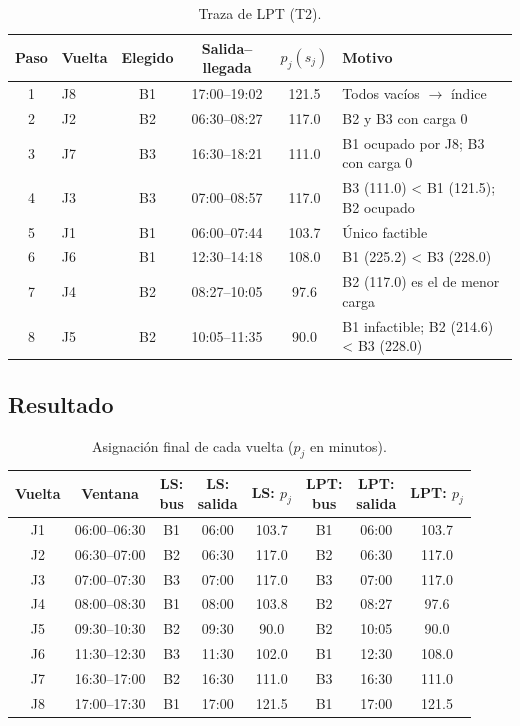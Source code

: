 \begin{table}[H]
\centering\small
\caption{Traza de LPT (T2).}\label{tab:traza-lpt}
\begin{tabular}{clcccl}
\toprule
Paso & Vuelta & Elegido & Salida--llegada & $p_j(s_j)$ & Motivo \\
\midrule
1 & J8 & B1 & 17:00--19:02 & 121.5 & Todos vacíos $\to$ índice \\
2 & J2 & B2 & 06:30--08:27 & 117.0 & B2 y B3 con carga 0 \\
3 & J7 & B3 & 16:30--18:21 & 111.0 & B1 ocupado por J8; B3 con carga 0 \\
4 & J3 & B3 & 07:00--08:57 & 117.0 & B3 (111.0) < B1 (121.5); B2 ocupado \\
5 & J1 & B1 & 06:00--07:44 & 103.7 & Único factible \\
6 & J6 & B1 & 12:30--14:18 & 108.0 & B1 (225.2) < B3 (228.0) \\
7 & J4 & B2 & 08:27--10:05 & 97.6 & B2 (117.0) es el de menor carga \\
8 & J5 & B2 & 10:05--11:35 & 90.0 & B1 infactible; B2 (214.6) < B3 (228.0) \\
\bottomrule
\end{tabular}
\end{table}

\subsection{Resultado}
\begin{table}[H]
\centering\small
\caption{Asignación final de cada vuelta ($p_j$ en minutos).}\label{tab:manual-asig}
\setlength{\tabcolsep}{5pt}
\begin{tabular}{cccccccc}
\toprule
Vuelta & Ventana & \makecell{LS:\\bus} & \makecell{LS:\\salida} & \makecell{LS:\\$p_j$} & \makecell{LPT:\\bus} & \makecell{LPT:\\salida} & \makecell{LPT:\\$p_j$} \\
\midrule
J1 & 06:00--06:30 & B1 & 06:00 & 103.7 & B1 & 06:00 & 103.7 \\
J2 & 06:30--07:00 & B2 & 06:30 & 117.0 & B2 & 06:30 & 117.0 \\
J3 & 07:00--07:30 & B3 & 07:00 & 117.0 & B3 & 07:00 & 117.0 \\
J4 & 08:00--08:30 & B1 & 08:00 & 103.8 & B2 & 08:27 & 97.6 \\
J5 & 09:30--10:30 & B2 & 09:30 & 90.0 & B2 & 10:05 & 90.0 \\
J6 & 11:30--12:30 & B3 & 11:30 & 102.0 & B1 & 12:30 & 108.0 \\
J7 & 16:30--17:00 & B2 & 16:30 & 111.0 & B3 & 16:30 & 111.0 \\
J8 & 17:00--17:30 & B1 & 17:00 & 121.5 & B1 & 17:00 & 121.5 \\
\bottomrule
\end{tabular}
\end{table}

